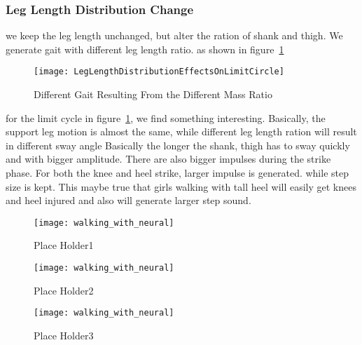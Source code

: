 \subsubsection*{Leg Length Distribution Change}
we keep the leg length unchanged, but alter the ration of shank and thigh.
We generate gait with different leg length ratio.
as shown in figure~\ref{fig:differentlr}

\begin{figure}[!htbp]
  \begin{center}
      \texttt{[image: LegLengthDistributionEffectsOnLimitCircle]}
    \caption{Different Gait Resulting From the Different Mass Ratio}
    \label{fig:differentlr}
\end{center}
\end{figure}

for the limit cycle in figure~\ref{fig:differentlr}, we find something interesting.
Basically, the support leg motion is almost the same, while different leg length ration will result in different sway angle
Basically the longer the shank, thigh has to sway quickly and with bigger amplitude.
There are also bigger impulses during the strike phase. For both the knee and heel strike, larger impulse is generated.
while step size is kept.
This maybe true that girls walking with tall heel will easily get knees and heel injured and also will generate larger step sound.


\begin{figure}[!htbp]
  \begin{center}
      \texttt{[image: walking\_with\_neural]}
    \caption{Place Holder1}
    \label{fig:lr1}
\end{center}
\end{figure}

\begin{figure}[!htbp]
  \begin{center}
      \texttt{[image: walking\_with\_neural]}
    \caption{Place Holder2}
    \label{fig:lr2}
\end{center}
\end{figure}

\begin{figure}[!htbp]
  \begin{center}
      \texttt{[image: walking\_with\_neural]}
    \caption{Place Holder3}
    \label{fig:lr3}
\end{center}
\end{figure}




